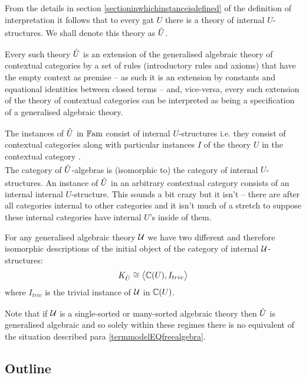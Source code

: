 \note 
From the details  in
section \ref{sectioninwhichinstanceisdefined} 
of the definition of interpretation
it follows that 
to every gat $U$ there is a theory of internal $U$-structures. We shall denote this theory as $\hatU$.

Every such theory $\hatU$ is an extension of the generalised algebraic theory of contextual categories
by a set of rules (introductory rules and axioms) that have  the empty context as premise -- as such it is an extension
by constants and equational identities between closed terms -- and, vice-versa, every such extension of
the theory of contextual categories can be interpreted as being a specification of a generalised algebraic theory.  

\note 
The instances of $\hatU$  in $\Fam$ consist of  internal $U$-structures  i.e. they consist of contextual categories \catcw along with particular instances $I$ of
the theory $U$ in the contextual category \catc. \\
The category of $\hatU$-algebras is (isomorphic to) the category of internal $U$-structures.
\note
An instance of $\hatU$ in an arbitrary contextual category
consists of  an internal internal $U$-structure. This sounds a bit crazy but it isn't -- there are after all categories internal to other categories and it isn't much of a stretch to suppose these internal categories have internal $U$'s inside of them. 



\note
\label{termmodelEQfreealgebra}For any generalised algebraic theory $\gat[U]$ we have two different 
and therefore isomorphic descriptions of the initial object of the category of internal $\gatU$-structures:\\
\begin{equation}
K_{\hat{U}} \cong \bigtuple{\CofU, I_{triv}}
\end{equation}
where $I_{triv}$ is the trivial instance of $\gatU$ in $\CofU$.

\note 
Note that if $\gat[U]$ is a single-sorted or many-sorted algebraic theory then 
$\hatU$ is generalised algebraic 
and so solely within these regimes there is no equivalent of the situation described para \ref{termmodelEQfreealgebra}.

\subsection{Outline}

